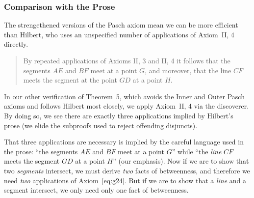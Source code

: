 \subsubsection{Comparison with the Prose}
The strengethened versions of the Pasch axiom mean we can be more efficient than Hilbert, who uses an unspecified number of applications of Axiom~II, 4 directly.

\begin{quote}
By repeated applications of Axioms II, 3 and II, 4 it follows that the segments $AE$ and $BF$ meet at a point $G$, and moreover, that the line $CF$ meets the segment at the point $GD$ at a point $H$.
\end{quote}

In our other verification of Theorem~5, which avoids the Inner and Outer Pasch axioms and follows Hilbert most closely, we apply Axiom~II, 4 via the  discoverer. By doing so, we see there are exactly three applications implied by Hilbert's prose (we elide the subproofs used to reject offending disjuncts).

\linebreak

That three applications are necessary is implied by the careful language used in the prose: ``the segments $AE$ and $BF$ meet at a point $G$'' while ``the \emph{line} $CF$ meets the segment $GD$ at a point $H$'' (our emphasis). Now if we are to show that two \emph{segments} intersect, we must derive \emph{two} facts of betweenness, and therefore we need \emph{two} applications of Axiom~\ref{eq:g24}. But if we are to show that a \emph{line} and a segment intersect, we only need only one fact of betweenness. 

